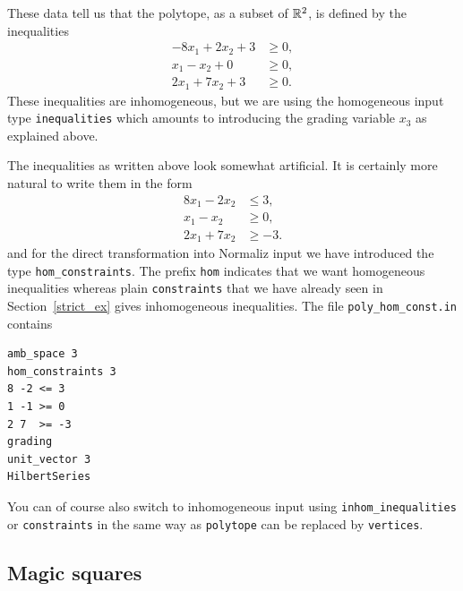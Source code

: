 These data tell us that the polytope, as a subset of ${\mathbb R}^2$, is defined by the inequalities
\begin{align*}
-8x_1+2x_2+3&\ge0,\\
x_1-x_2+0&\ge0,\\
2x_1+7x_2+3&\ge 0.
\end{align*}
These inequalities are inhomogeneous, but we are using the homogeneous input type \verb|inequalities| which amounts to introducing the grading variable $x_3$ as explained above.


The inequalities as written above look somewhat artificial. It is certainly more natural to write them in the form
\begin{align*}
8x_1-2x_2&\le 3,\\
x_1-x_2&\ge0,\\
2x_1+7x_2&\ge -3.
\end{align*}
and for the direct transformation into Normaliz input we have introduced the type \verb|hom_constraints|. The prefix \verb|hom| indicates that we want homogeneous inequalities whereas plain \verb|constraints| that we have already seen in Section~\ref{strict_ex} gives inhomogeneous inequalities. The file \verb|poly_hom_const.in| contains
\begin{Verbatim}
amb_space 3
hom_constraints 3
8 -2 <= 3
1 -1 >= 0
2 7  >= -3
grading
unit_vector 3
HilbertSeries
\end{Verbatim}

You can of course also switch to inhomogeneous input using \verb|inhom_inequalities| or \verb|constraints| in the same way as \verb|polytope| can be replaced by \verb|vertices|.

\subsection{Magic squares}\label{eq_ex}

